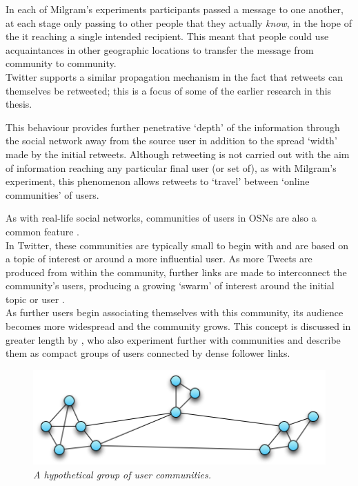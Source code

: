 In each of Milgram's experiments participants passed a message to one another, at each stage only passing to other people that they actually \textit{know}, in the hope of the it reaching a single intended recipient. This meant that people could use acquaintances in other geographic locations to transfer the message from community to community.\\
Twitter supports a similar propagation mechanism in the fact that retweets can themselves be retweeted; this is a focus of some of the earlier research in this thesis.

This behaviour provides further penetrative `depth' of the information through the social network away from the source user in addition to the spread `width' made by the initial retweets. Although retweeting is not carried out with the aim of information reaching any particular final user (or set of), as with Milgram's experiment, this phenomenon allows retweets to `travel' between `online communities' of users.

As with real-life social networks, communities of users in OSNs are also a common feature \cite{ugander11}.\\
In Twitter, these communities are typically small to begin with and are based on a topic of interest or around a more influential user. As more Tweets are produced from within the community, further links are made to interconnect the community's users, producing a growing `swarm' of interest around the initial topic or user \cite{java07}. \\
As further users begin associating themselves with this community, its audience becomes more widespread and the community grows. This concept is discussed in greater length by \cite{java07}, who also experiment further with communities and describe them as compact groups of users connected by dense follower links.

\begin{figure}[h]
\centering
\includegraphics[scale=0.7]{2.Background/Media/communities.png} 
\caption{\textit{A hypothetical group of user communities.}}
\label{fig:communities}
\end{figure}

